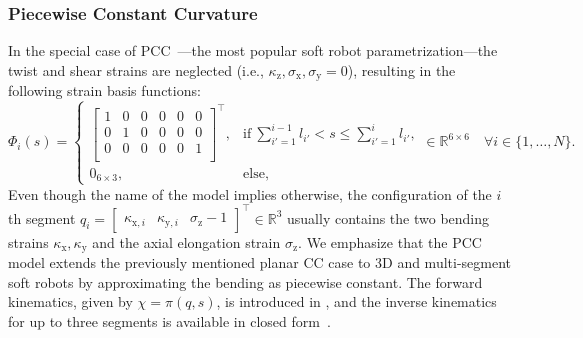\subsubsection{Piecewise Constant Curvature}
In the special case of \gls{PCC}~\citep{webster2010design}—the most popular soft robot parametrization—the twist and shear strains are neglected (i.e., $\kappa_\mathrm{z}, \sigma_\mathrm{x}, \sigma_\mathrm{y} = 0$), resulting in the following strain basis functions:
\begin{equation}
    \Phi_i(s) = \begin{cases}
        \begin{bmatrix}
            1 & 0 & 0 & 0 & 0 & 0\\
            0 & 1 & 0 & 0 & 0 & 0\\
            0 & 0 & 0 & 0 & 0 & 1\\
        \end{bmatrix}^\top
        , & \text{if} \: \sum_{i'=1}^{i-1} l_{i'} < s \leq \sum_{i'= 1}^{i} l_{i'}, \\
        0_{6\times 3}, & \text{else},
    \end{cases} \in \mathbb{R}^{6 \times 6} \quad \forall i \in \{ 1,\dots, N \}.
\end{equation}
Even though the name of the model implies otherwise, the configuration of the $i$th segment $q_i=\begin{bmatrix}
    \kappa_{\mathrm{x},i} & \kappa_{\mathrm{y},i} & \sigma_\mathrm{z}-1
\end{bmatrix}^\top \in \mathbb{R}^3$ usually contains the two bending strains $\kappa_\mathrm{x}, \kappa_\mathrm{y}$ and the axial elongation strain $\sigma_\mathrm{z}$.
We emphasize that the \gls{PCC} model extends the previously mentioned planar \gls{CC} case to 3D and multi-segment soft robots by approximating the bending as piecewise constant. The forward kinematics, given by $\chi=\pi(q,s)$, is introduced in \citet{webster2010design, della2020improved}, and the inverse kinematics for up to three segments is available in closed form~\citep{li2023kinematics}.

